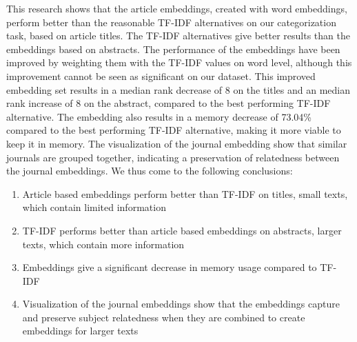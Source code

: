 \documentclass[../../Thesis.tex]{subfiles}
\begin{document}
This research shows that the article embeddings, created with word embeddings, perform better than the reasonable TF-IDF alternatives on our categorization task, based on article titles. The TF-IDF alternatives give better results than the embeddings based on abstracts. The performance of the embeddings have been improved by weighting them with the TF-IDF values on word level, although this improvement cannot be seen as significant on our dataset. This improved embedding set results in a median rank decrease of 8 on the titles and an median rank increase of 8 on the abstract, compared to the best performing TF-IDF alternative.  The embedding also results in a memory decrease of 73.04\% compared to the best performing TF-IDF alternative, making it more viable to keep it in memory. The visualization of the journal embedding show that similar journals are grouped together, indicating a preservation of relatedness between the journal embeddings. We thus come to the following conclusions:
\begin{enumerate}
\item{Article based embeddings perform better than TF-IDF on titles, small texts, which contain limited information}
\item{TF-IDF performs better than article based embeddings on abstracts, larger texts, which contain more information}
\item{Embeddings give a significant decrease in memory usage compared to TF-IDF}
\item{Visualization of the journal embeddings show that the embeddings capture and preserve subject relatedness when they are combined to create embeddings for larger texts}

\end{enumerate}
\end{document}
